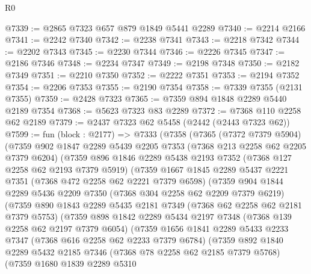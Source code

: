 \begin{lexlean}{R0}
\begin{coremodule}
@7339 := @2865 @7323 @657 @879 @1849 @5441 @2289
@7340 := @2214 @2166
@7341 := @2242 @7340
@7342 := @2238 @7341
@7343 := @2218 @7342
@7344 := @2202 @7343
@7345 := @2230 @7344
@7346 := @2226 @7345
@7347 := @2186 @7346
@7348 := @2234 @7347
@7349 := @2198 @7348
@7350 := @2182 @7349
@7351 := @2210 @7350
@7352 := @2222 @7351
@7353 := @2194 @7352
@7354 := @2206 @7353
@7355 := @2190 @7354
@7358 := @7339 @7355 (@2131 @7355)
@7359 := @2428 @7323
@7365 := @7359 @894 @1848 @2289 @5440 @2189 @7354
@7368 := @5623 @7323 @83 @2289
@7372 := @7368 @110 @2258 @62 @2189
@7379 := @2437 @7323 @62 @5458 (@2442 (@2443 @7323 @62))
@7599 := fun (block : @2177) =>
  @7333
    (@7358
      (@7365
        (@7372 @7379 @5904)
        (@7359
          @902
          @1847
          @2289
          @5439
          @2205
          @7353
          (@7368 @213 @2258 @62 @2205 @7379 @6204)
          (@7359
            @896
            @1846
            @2289
            @5438
            @2193
            @7352
            (@7368 @127 @2258 @62 @2193 @7379 @5919)
            (@7359
              @1667
              @1845
              @2289
              @5437
              @2221
              @7351
              (@7368 @472 @2258 @62 @2221 @7379 @6598)
              (@7359
                @904
                @1844
                @2289
                @5436
                @2209
                @7350
                (@7368 @304 @2258 @62 @2209 @7379 @6219)
                (@7359
                  @890
                  @1843
                  @2289
                  @5435
                  @2181
                  @7349
                  (@7368 @62 @2258 @62 @2181 @7379 @5753)
                  (@7359
                    @898
                    @1842
                    @2289
                    @5434
                    @2197
                    @7348
                    (@7368 @139 @2258 @62 @2197 @7379 @6054)
                    (@7359
                      @1656
                      @1841
                      @2289
                      @5433
                      @2233
                      @7347
                      (@7368 @616 @2258 @62 @2233 @7379 @6784)
                      (@7359
                        @892
                        @1840
                        @2289
                        @5432
                        @2185
                        @7346
                        (@7368 @78 @2258 @62 @2185 @7379 @5768)
                        (@7359
                          @1680
                          @1839
                          @2289
                          @5310

\end{coremodule}
\end{lexlean}
